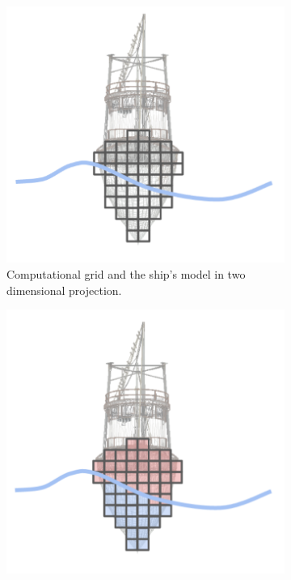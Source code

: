 \documentclass{report}
\begin{document}
\begin{figure}[htb]
    \centering %
\begin{subfigure}{0.25\textwidth}
  \includegraphics[width=\linewidth]{images/ship_algo_1.pdf}
  \caption{Computational grid and the ship's model in two dimensional projection.}
  \label{fig:ship_algo_1}
\end{subfigure}\hfil %
\begin{subfigure}{0.25\textwidth}
  \includegraphics[width=\linewidth]{images/ship_algo_2.pdf}

\end{subfigure}
\end{figure}
\end{document}
